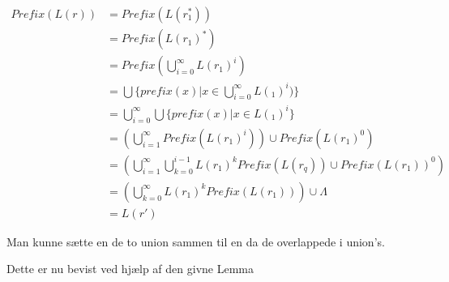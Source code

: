 \documentclass{article}
\begin{document}
    \begin{align*}
        Prefix(L(r)) &= Prefix(L(r_1^*)) \\
            &= Prefix(L(r_1)^*) \\
            &= Prefix(\bigcup^{\infty}_{i=0}L(r_1)^i) \\
            &= \bigcup\{prefix(x) | x \in \bigcup^{\infty}_{i=0}L(_1)^i)\} \\
            &= \bigcup^{\infty}_{i=0} \bigcup\{prefix(x) | x \in L(_1)^i\} \\
            &= (\bigcup^{\infty}_{i=1}Prefix(L(r_1)^i)) \cup Prefix(L(r_1)^0) \\
            &= (\bigcup^{\infty}_{i=1}\bigcup^{i-1}_{k=0}L(r_1)^kPrefix(L(r_q)) \cup Prefix(L(r_1))^0)\\
            &= (\bigcup^{\infty}_{k=0}L(r_1)^kPrefix(L(r_1))) \cup \Lambda\\
            &= L(r')
    \end{align*}
    
    Man kunne sætte en de to union sammen til en da de overlappede i union's.
    
    Dette er nu bevist ved hjælp af den givne Lemma
\end{document}
